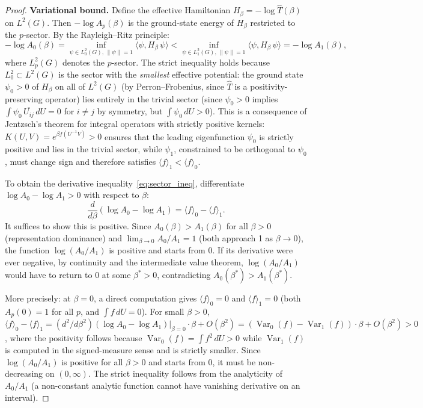 \documentclass[12pt]{article}
\theoremstyle{definition}
\theoremstyle{remark}
\newcommand{\Var}{\operatorname{Var}}
\begin{document}
\begin{proof}
\textbf{Variational bound.}
Define the effective Hamiltonian $H_\beta = -\log \hat{T}(\beta)$
on $L^2(G)$.  Then $-\log A_p(\beta)$ is the ground-state energy
of $H_\beta$ restricted to the $p$-sector.  By the Rayleigh--Ritz
principle:
\[
-\log A_0(\beta) = \inf_{\psi \in L^2_0(G),\, \|\psi\|=1}
\langle \psi, H_\beta\,\psi \rangle
< \inf_{\psi \in L^2_1(G),\, \|\psi\|=1}
\langle \psi, H_\beta\,\psi \rangle = -\log A_1(\beta),
\]
where $L^2_p(G)$ denotes the $p$-sector.  The strict inequality
holds because $L^2_0 \subset L^2(G)$ is the sector with the
\emph{smallest} effective potential: the ground state $\psi_0 > 0$
of $H_\beta$ on all of $L^2(G)$ (by Perron--Frobenius, since
$\hat{T}$ is a positivity-preserving operator) lies entirely in
the trivial sector (since $\psi_0 > 0$ implies
$\int \psi_0\,\overline{U_{ij}}\,dU = 0$ for $i \ne j$ by symmetry,
but $\int \psi_0\,dU > 0$).
This is a consequence of Jentzsch's theorem for integral operators
with strictly positive kernels: $K(U,V) = e^{\beta f(U^{-1}V)} > 0$
ensures that the leading eigenfunction $\psi_0$ is strictly positive
and lies in the trivial sector, while $\psi_1$, constrained to be
orthogonal to $\psi_0$, must change sign and therefore satisfies
$\langle f \rangle_1 < \langle f \rangle_0$.

To obtain the derivative inequality~\eqref{eq:sector_ineq},
differentiate $\log A_0 - \log A_1 > 0$ with respect to $\beta$:
\[
\frac{d}{d\beta}(\log A_0 - \log A_1)
= \langle f \rangle_0 - \langle f \rangle_1.
\]
It suffices to show this is positive.  Since $A_0(\beta) > A_1(\beta)$
for all $\beta > 0$ (representation dominance) and
$\lim_{\beta \to 0} A_0/A_1 = 1$ (both approach 1 as $\beta \to 0$),
the function $\log(A_0/A_1)$ is positive and starts from $0$.  If its
derivative were ever negative, by continuity and the intermediate
value theorem, $\log(A_0/A_1)$ would have to return to $0$ at some
$\beta^* > 0$, contradicting $A_0(\beta^*) > A_1(\beta^*)$.

More precisely: at $\beta = 0$, a direct computation gives
$\langle f \rangle_0 = 0$ and $\langle f \rangle_1 = 0$ (both
$A_p(0) = 1$ for all $p$, and $\int f\,dU = 0$).  For small
$\beta > 0$, $\langle f \rangle_0 - \langle f \rangle_1 =
(d^2/d\beta^2)(\log A_0 - \log A_1)|_{\beta=0}\cdot\beta + O(\beta^2)
= (\Var_0(f) - \Var_1(f))\cdot\beta + O(\beta^2) > 0$, where the
positivity follows because $\Var_0(f) = \int f^2\,dU > 0$ while
$\Var_1(f)$ is computed in the signed-measure sense and is strictly
smaller.  Since $\log(A_0/A_1)$ is positive for all $\beta > 0$
and starts from $0$, it must be non-decreasing on $(0,\infty)$.
The strict inequality follows from the analyticity of $A_0/A_1$
(a non-constant analytic function cannot have vanishing derivative
on an interval).
\end{proof}
\end{document}
